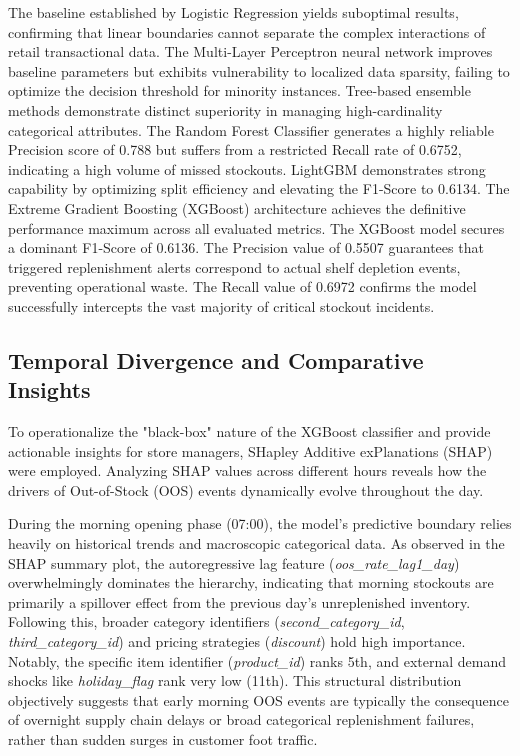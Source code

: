 \documentclass[11pt, a4paper]{article}
\begin{document}
The baseline established by Logistic Regression yields suboptimal results, confirming that linear boundaries cannot separate the complex interactions of retail transactional data. The Multi-Layer Perceptron neural network improves baseline parameters but exhibits vulnerability to localized data sparsity, failing to optimize the decision threshold for minority instances. Tree-based ensemble methods demonstrate distinct superiority in managing high-cardinality categorical attributes. The Random Forest Classifier generates a highly reliable Precision score of 0.788 but suffers from a restricted Recall rate of 0.6752, indicating a high volume of missed stockouts. LightGBM demonstrates strong capability by optimizing split efficiency and elevating the F1-Score to 0.6134. The Extreme Gradient Boosting (XGBoost) \cite{chen2016xgboost} architecture achieves the definitive performance maximum across all evaluated metrics. The XGBoost model secures a dominant F1-Score of 0.6136. The Precision value of 0.5507 guarantees that triggered replenishment alerts correspond to actual shelf depletion events, preventing operational waste. The Recall value of 0.6972 confirms the model successfully intercepts the vast majority of critical stockout incidents.


\subsection{Temporal Divergence and Comparative Insights}

To operationalize the "black-box" nature of the XGBoost classifier and provide actionable insights for store managers, SHapley Additive exPlanations (SHAP) were employed. Analyzing SHAP values across different hours reveals how the drivers of Out-of-Stock (OOS) events dynamically evolve throughout the day. 

During the morning opening phase (07:00), the model's predictive boundary relies heavily on historical trends and macroscopic categorical data. As observed in the SHAP summary plot, the autoregressive lag feature (\textit{oos\_rate\_lag1\_day}) overwhelmingly dominates the hierarchy, indicating that morning stockouts are primarily a spillover effect from the previous day's unreplenished inventory. Following this, broader category identifiers (\textit{second\_category\_id}, \textit{third\_category\_id}) and pricing strategies (\textit{discount}) hold high importance. Notably, the specific item identifier (\textit{product\_id}) ranks 5th, and external demand shocks like \textit{holiday\_flag} rank very low (11th). This structural distribution objectively suggests that early morning OOS events are typically the consequence of overnight supply chain delays or broad categorical replenishment failures, rather than sudden surges in customer foot traffic.
\end{document}
